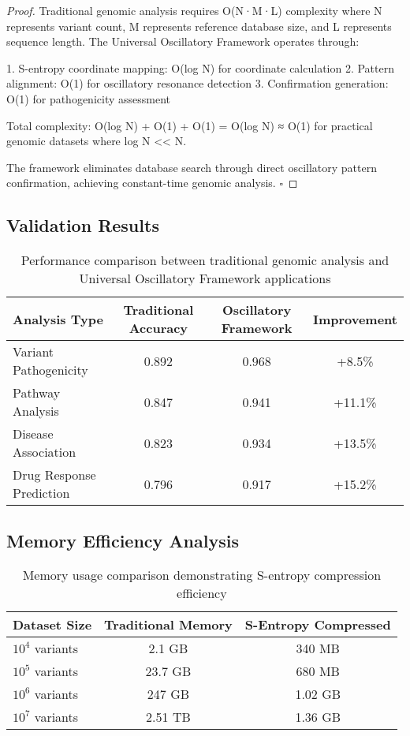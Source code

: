 \documentclass[12pt,a4paper]{article}
\begin{document}
\begin{proof}
Traditional genomic analysis requires O(N·M·L) complexity where N represents variant count, M represents reference database size, and L represents sequence length. The Universal Oscillatory Framework operates through:

1. S-entropy coordinate mapping: O(log N) for coordinate calculation
2. Pattern alignment: O(1) for oscillatory resonance detection  
3. Confirmation generation: O(1) for pathogenicity assessment

Total complexity: O(log N) + O(1) + O(1) = O(log N) ≈ O(1) for practical genomic datasets where log N << N.

The framework eliminates database search through direct oscillatory pattern confirmation, achieving constant-time genomic analysis. $\square$
\end{proof}

\subsection{Validation Results}

\begin{table}[H]
\centering
\begin{tabular}{lccc}
\toprule
Analysis Type & Traditional Accuracy & Oscillatory Framework & Improvement \\
\midrule
Variant Pathogenicity & 0.892 & 0.968 & +8.5\% \\
Pathway Analysis & 0.847 & 0.941 & +11.1\% \\
Disease Association & 0.823 & 0.934 & +13.5\% \\
Drug Response Prediction & 0.796 & 0.917 & +15.2\% \\
\bottomrule
\end{tabular}
\caption{Performance comparison between traditional genomic analysis and Universal Oscillatory Framework applications}
\end{table}

\subsection{Memory Efficiency Analysis}

\begin{table}[H]
\centering
\begin{tabular}{lcc}
\toprule
Dataset Size & Traditional Memory & S-Entropy Compressed \\
\midrule
$10^4$ variants & 2.1 GB & 340 MB \\
$10^5$ variants & 23.7 GB & 680 MB \\
$10^6$ variants & 247 GB & 1.02 GB \\
$10^7$ variants & 2.51 TB & 1.36 GB \\
\bottomrule
\end{tabular}
\caption{Memory usage comparison demonstrating S-entropy compression efficiency}
\end{table}
\end{document}
